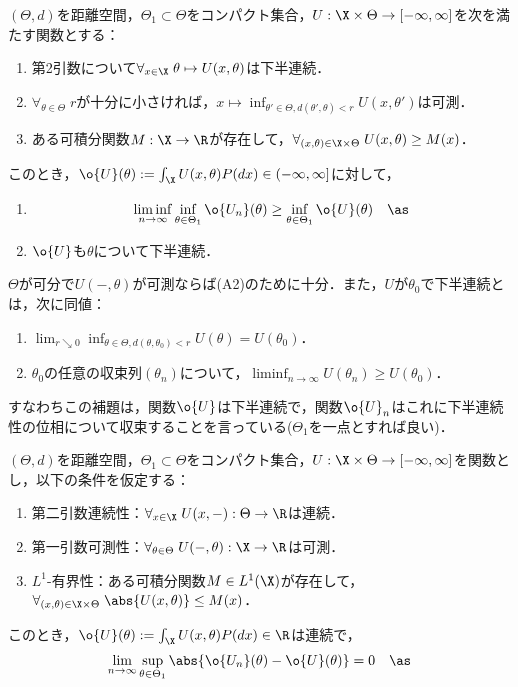\documentclass[uplatex,dvipdfmx]{jsreport}
\begin{document}
\begin{lemma}[単一方向に関する一様対数の法則]\label{lemma-A-one-sided-Uniform-LoN}
    $(\Theta,d)$を距離空間，$\Theta_1\subset\Theta$をコンパクト集合，$U:\X\times\Theta\to[-\infty,\infty]$を次を満たす関数とする：
    \begin{enumerate}[({A}1)]
        \item 第2引数について$\forall_{x\in\X}\;\theta\mapsto U(x,\theta)$は下半連続．
        \item $\forall_{\theta\in\Theta}\;r$が十分に小さければ，$x\mapsto\inf_{\theta'\in\Theta,d(\theta',\theta)<r}U(x,\theta')$は可測．
        \item ある可積分関数$M:\X\to\R$が存在して，$\forall_{(x,\theta)\in\X\times\Theta}\;U(x,\theta)\ge M(x)$．
    \end{enumerate}
    このとき，$\o{U}(\theta):=\int_\X U(x,\theta)P(dx)\in(-\infty,\infty]$に対して，
    \begin{enumerate}
        \item 
        \[\liminf_{n\to\infty}\inf_{\theta\in\Theta_1}\o{U_n}(\theta)\ge\inf_{\theta\in\Theta_1}\o{U}(\theta)\quad\as\]
        \item $\o{U}$も$\theta$について下半連続．
    \end{enumerate}
\end{lemma}
\begin{remarks}
    $\Theta$が可分で$U(-,\theta)$が可測ならば(A2)のために十分．また，$U$が$\theta_0$で下半連続とは，次に同値：
    \begin{enumerate}
        \item $\lim_{r\searrow0}\inf_{\theta\in\Theta,d(\theta,\theta_0)<r}U(\theta)=U(\theta_0)$．
        \item $\theta_0$の任意の収束列$(\theta_n)$について，$\liminf_{n\to\infty}U(\theta_n)\ge U(\theta_0)$．
    \end{enumerate}
    すなわちこの補題は，関数$\o{U}$は下半連続で，関数$\o{U}_n$はこれに下半連続性の位相について収束することを言っている($\Theta_1$を一点とすれば良い)．
\end{remarks}

\begin{theorem}\label{thm-B-Uniform-LoN}
    $(\Theta,d)$を距離空間，$\Theta_1\subset\Theta$をコンパクト集合，$U:\X\times\Theta\to[-\infty,\infty]$を関数とし，以下の条件を仮定する：
    \begin{enumerate}[({B}1)]
        \item 第二引数連続性：$\forall_{x\in\X}\;U(x,-):\Theta\to\R$は連続．
        \item 第一引数可測性：$\forall_{\theta\in\Theta}\;U(-,\theta):\X\to\R$は可測．
        \item $L^1$-有界性：ある可積分関数$M\in L^1(\X)$が存在して，$\forall_{(x,\theta)\in\X\times\Theta}\;\abs{U(x,\theta)}\le M(x)$．
    \end{enumerate}
    このとき，$\o{U}(\theta):=\int_\X U(x,\theta)P(dx)\in\R$は連続で，
    \[\lim_{n\to\infty}\sup_{\theta\in\Theta_1}\abs{\o{U_n}(\theta)-\o{U}(\theta)}=0\quad\as\]
\end{theorem}
\end{document}
